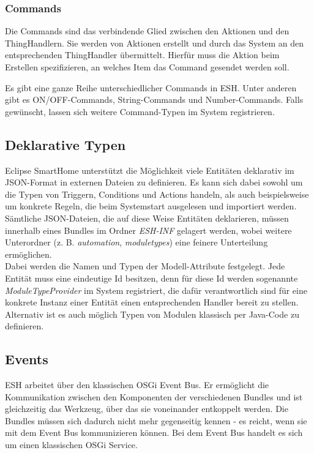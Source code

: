 \subsubsection{Commands}
Die Commands sind das verbindende Glied zwischen den Aktionen und den ThingHandlern. Sie werden von Aktionen erstellt und durch das System an den entsprechenden ThingHandler übermittelt. Hierfür muss die Aktion beim Erstellen spezifizieren, an welches Item das Command gesendet werden soll. 

Es gibt eine ganze Reihe unterschiedlicher Commands in ESH. Unter anderen gibt es ON/OFF-Commands, String-Commands und Number-Commands. Falls gewünscht, lassen sich weitere Command-Typen im System registrieren.


\subsection{Deklarative Typen}
\label{subsec:decltypes}
Eclipse SmartHome unterstützt die Möglichkeit viele Entitäten deklarativ im JSON-Format\cite{json} in externen Dateien zu definieren. Es kann sich dabei sowohl um die Typen von Triggern, Conditions und Actions handeln, als auch beispielsweise um konkrete Regeln, die beim Systemstart ausgelesen und importiert werden. Sämtliche JSON-Dateien, die auf diese Weise Entitäten deklarieren, müssen innerhalb eines Bundles im Ordner \textit{ESH-INF} gelagert werden, wobei weitere Unterordner (z. B. \textit{automation}, \textit{moduletypes}) eine feinere Unterteilung ermöglichen. \\

Dabei werden die Namen und Typen der Modell-Attribute festgelegt. Jede Entität muss eine eindeutige Id besitzen, denn für diese Id werden sogenannte \textit{ModuleTypeProvider} im System registriert, die dafür verantwortlich sind für eine konkrete Instanz einer Entität einen entsprechenden Handler bereit zu stellen.\\

Alternativ ist es auch möglich Typen von Modulen klassisch per Java-Code zu definieren.

\subsection{Events}
ESH arbeitet über den klassischen OSGi Event Bus. Er ermöglicht die Kommunikation zwischen den Komponenten der verschiedenen Bundles und ist gleichzeitig das Werkzeug, über das sie voneinander entkoppelt werden. Die Bundles müssen sich dadurch nicht mehr gegenseitig kennen - es reicht, wenn sie mit dem Event Bus kommunizieren können. Bei dem Event Bus handelt es sich um einen klassischen OSGi Service.

